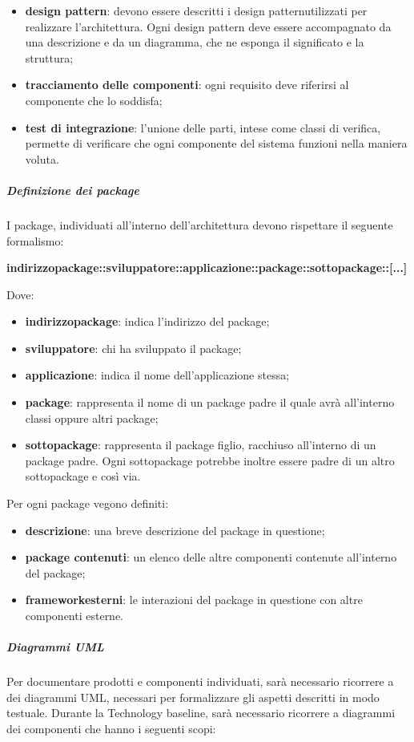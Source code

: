 \begin{itemize}
\begin{itemize}
				\item \textbf{design pattern}: devono essere descritti i design pattern\glosp utilizzati per realizzare l'architettura. Ogni design pattern deve essere accompagnato da una descrizione e da un diagramma, che ne esponga il significato e la struttura;
				\item \textbf{tracciamento delle componenti}: ogni requisito deve riferirsi al componente che lo soddisfa;
				\item \textbf{test di integrazione}: l'unione delle parti, intese come classi di verifica, permette di verificare che ogni componente del sistema funzioni nella maniera voluta.
			\end{itemize}
			\subparagraph{Definizione dei package}
			I package\glo, individuati all'interno dell'architettura devono rispettare il seguente formalismo:\newline \newline			\centerline{\textbf{indirizzo\textunderscore package::sviluppatore::applicazione::package::sottopackage::[...]}}\newline
			Dove:
			\begin{itemize}
			\item \textbf{indirizzo\textunderscore package}: indica l'indirizzo del package;
			\item \textbf{sviluppatore}: chi ha sviluppato il package;
			\item \textbf{applicazione}: indica il nome dell'applicazione stessa;
			\item \textbf{package}: rappresenta il nome di un package padre il quale avrà all'interno classi oppure altri package;
			\item \textbf{sottopackage}: rappresenta il package figlio, racchiuso all'interno di un package padre. Ogni sottopackage potrebbe inoltre essere padre di un altro sottopackage e così via.
			\end{itemize}
			Per ogni package vegono definiti:
			\begin{itemize}
			\item \textbf{descrizione}: una breve descrizione del package in questione;
			\item \textbf{package contenuti}: un elenco delle altre componenti contenute all'interno del package;
			\item \textbf{framework\glosp esterni}: le interazioni del package in questione con altre componenti esterne.
			\end{itemize}
			\subparagraph{Diagrammi UML}
			Per documentare prodotti e componenti individuati, sarà necessario ricorrere a dei diagrammi UML\glo, necessari per formalizzare gli aspetti descritti in modo testuale. Durante la Technology baseline, sarà necessario ricorrere a diagrammi dei componenti che hanno i seguenti scopi:

\end{itemize}

